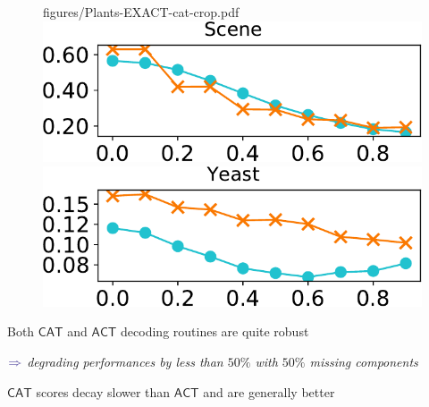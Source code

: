 \documentclass[xcolor={usenames,dvipsnames,svgnames}, compress]{beamer}
\begin{document}
\begin{frame}[t]
\begin{figure}
     {figures/Plants-EXACT-cat-crop.pdf}\hspace{2pt}
     \includegraphics[width=0.22\columnwidth]
     {figures/Scene-EXACT-cat-crop.pdf}\hspace{2pt}
     \includegraphics[width=0.22\columnwidth]
     {figures/Yeast-EXACT-cat-crop.pdf}%
   \label{fig:miss-exa}
 \end{figure}




%
%
Both $\mathsf{CAT}$ and $\mathsf{ACT}$ decoding routines are quite
robust
\begin{minipage}{1.0\linewidth}
      \raggedleft
      $\color{violet}\boldsymbol\Rightarrow$
      \scriptsize
     \emph{degrading performances by less than $50\%$ with $50\%$ missing components}
\end{minipage}\par\bigskip
$\mathsf{CAT}$ scores decay slower than $\mathsf{ACT}$ and are generally better
\end{frame}
\end{document}
